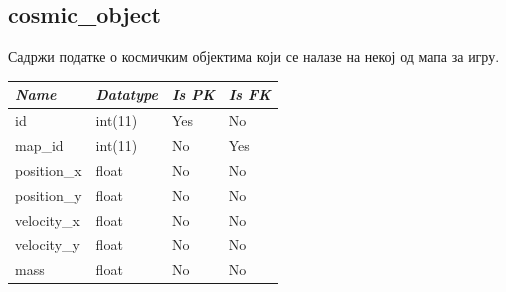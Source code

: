 \subsection{cosmic\_object}
Садржи податке о космичким објектима који се налазе на некој од мапа за игру.

\begin{table}[h!]
\centering
\small

    \begin{tabular}{ | m{} | m{} | m{} | m{} | }
    \hline
        \cellcolor{blue!25}\textbf{\textit{Name}} &

        \cellcolor{blue!25}\textbf{\textit{Datatype}} &
        \cellcolor{blue!25}\textbf{\textit{Is PK}} &
        \cellcolor{blue!25}\textbf{\textit{Is FK}} \\
    \hline
    \hline
        id & int(11) & Yes & No \\
    \hline
        map\_id & int(11) & No & Yes \\
    \hline
        position\_x & float & No & No \\
    \hline
        position\_y & float & No & No \\
    \hline
        velocity\_x & float & No & No \\
    \hline
        velocity\_y & float & No & No \\
    \hline
        mass & float & No & No \\
    \hline
    \end{tabular}

\end{table}

